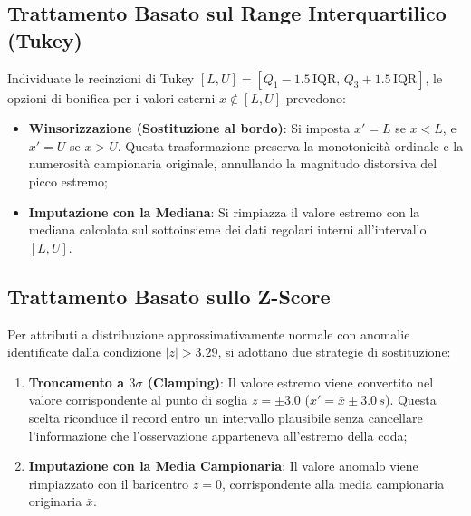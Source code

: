\FloatBarrier
\subsection{Trattamento Basato sul Range Interquartilico (Tukey)}
Individuate le recinzioni di Tukey $[L, U] = [Q_1 - 1.5\,\text{IQR}, \, Q_3 + 1.5\,\text{IQR}]$, le opzioni di bonifica per i valori esterni $x \notin [L, U]$ prevedono:
\begin{itemize}
    \item \textbf{Winsorizzazione (Sostituzione al bordo)}: Si imposta $x' = L$ se $x < L$, e $x' = U$ se $x > U$. Questa trasformazione preserva la monotonicità ordinale e la numerosità campionaria originale, annullando la magnitudo distorsiva del picco estremo;
    \item \textbf{Imputazione con la Mediana}: Si rimpiazza il valore estremo con la mediana calcolata sul sottoinsieme dei dati regolari interni all'intervallo $[L, U]$.
\end{itemize}

\FloatBarrier
\subsection{Trattamento Basato sullo Z-Score}
Per attributi a distribuzione approssimativamente normale con anomalie identificate dalla condizione $|z| > 3.29$, si adottano due strategie di sostituzione:
\begin{enumerate}
    \item \textbf{Troncamento a $3\sigma$ (Clamping)}: Il valore estremo viene convertito nel valore corrispondente al punto di soglia $z = \pm 3.0$ ($x' = \bar{x} \pm 3.0\,s$). Questa scelta riconduce il record entro un intervallo plausibile senza cancellare l'informazione che l'osservazione apparteneva all'estremo della coda;
    \item \textbf{Imputazione con la Media Campionaria}: Il valore anomalo viene rimpiazzato con il baricentro $z = 0$, corrispondente alla media campionaria originaria $\bar{x}$.
\end{enumerate}
